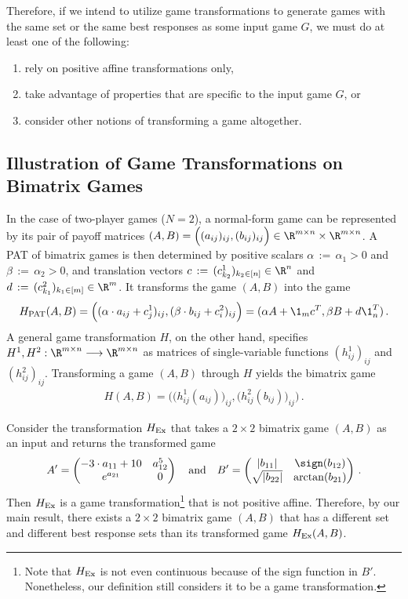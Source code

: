 Therefore, if we intend to utilize game transformations to generate games with the same \NE{} set or the same best responses as some input game $G$, we must do at least one of the following: 
\begin{enumerate}
    \item rely on positive affine transformations only,
    \item take advantage of properties that are specific to the input game $G$, or
    \item consider other notions of transforming a game altogether.
\end{enumerate}

\subsection{Illustration of Game Transformations on Bimatrix Games}
\label{sec:bimatrix games}
In the case of two-player games ($N = 2$), a normal-form game can be represented by its pair of payoff matrices $(A,B) =  \Big( (a_{ij})_{ij}, (b_{ij})_{ij} \Big) \in \R^{m \times n} \times \R^{m \times n}$. A PAT of bimatrix games is then determined by positive scalars $\alpha \, := \, \alpha_1 >0$ and $\beta \, := \, \alpha_2 > 0$, and translation vectors $c \, := \, (c_{k_2}^1)_{k_2 \in [n]} \in \R^n$ and $d \, := \, (c_{k_1}^2)_{k_1 \in [m]} \in \R^m$. It transforms the game $(A,B)$ into the game
\[H_{\textnormal{PAT}}(A,B) = \Big( ( \alpha \cdot a_{ij} + c_j^1)_{ij}, ( \beta \cdot b_{ij} + c_i^2)_{ij} \Big) = ( \alpha A + \1_m c^T, \beta B + d \1_n^T ) \, .\]
A general game transformation $H$, on the other hand, specifies $H^1, H^2 : \R^{m \times n} \longrightarrow  \R^{m \times n}$ as matrices of single-variable functions $(h_{ij}^1)_{ij}$ and $(h_{ij}^2)_{ij}$. Transforming a game $(A,B)$ through $H$ yields the bimatrix game
\begin{align}
\label{bimatrix game trafo}
H(A,B) = \Big( \big( h_{ij}^1(a_{ij}) \big)_{ij}, \big( h_{ij}^2(b_{ij}) \big)_{ij} \Big) \, .
\end{align}

\begin{ex}
Consider the transformation $H_{\textnormal{Ex}}$ that takes a $2 \times 2$ bimatrix game $(A,B)$ as an input and returns the transformed game
\[A' = \begin{pmatrix}
-3 \cdot a_{11} +10  & a_{12}^5\\
e^{a_{21}} & 0
\end{pmatrix}
 \quad \text{and} \quad
B'= \begin{pmatrix}
|b_{11}| & \sign (b_{12})\\
\sqrt{|b_{22}|} & \arctan (b_{21})
\end{pmatrix} \, . \]
Then $H_{\textnormal{Ex}}$ is a game transformation\footnote{Note that $H_{\textnormal{Ex}}$ is not even continuous because of the sign function in $B'$. Nonetheless, our definition still considers it to be a game transformation.} that is not positive affine. Therefore, by our main result, there exists a $2 \times 2$ bimatrix game $(A,B)$ that has a different \NE{} set and different best response sets than its transformed game $H_{\textnormal{Ex}}(A,B)$.
\end{ex}

